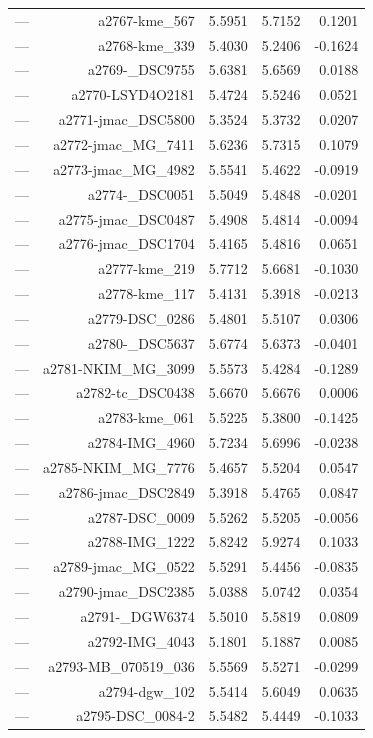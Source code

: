 \begin{table}[htbp]
\begin{tabular}{lrrrr}
— & a2767-kme_567 & 5.5951 & 5.7152 & 0.1201 \\
— & a2768-kme_339 & 5.4030 & 5.2406 & -0.1624 \\
— & a2769-_DSC9755 & 5.6381 & 5.6569 & 0.0188 \\
— & a2770-LSYD4O2181 & 5.4724 & 5.5246 & 0.0521 \\
— & a2771-jmac_DSC5800 & 5.3524 & 5.3732 & 0.0207 \\
— & a2772-jmac_MG_7411 & 5.6236 & 5.7315 & 0.1079 \\
— & a2773-jmac_MG_4982 & 5.5541 & 5.4622 & -0.0919 \\
— & a2774-_DSC0051 & 5.5049 & 5.4848 & -0.0201 \\
— & a2775-jmac_DSC0487 & 5.4908 & 5.4814 & -0.0094 \\
— & a2776-jmac_DSC1704 & 5.4165 & 5.4816 & 0.0651 \\
— & a2777-kme_219 & 5.7712 & 5.6681 & -0.1030 \\
— & a2778-kme_117 & 5.4131 & 5.3918 & -0.0213 \\
— & a2779-DSC_0286 & 5.4801 & 5.5107 & 0.0306 \\
— & a2780-_DSC5637 & 5.6774 & 5.6373 & -0.0401 \\
— & a2781-NKIM_MG_3099 & 5.5573 & 5.4284 & -0.1289 \\
— & a2782-tc_DSC0438 & 5.6670 & 5.6676 & 0.0006 \\
— & a2783-kme_061 & 5.5225 & 5.3800 & -0.1425 \\
— & a2784-IMG_4960 & 5.7234 & 5.6996 & -0.0238 \\
— & a2785-NKIM_MG_7776 & 5.4657 & 5.5204 & 0.0547 \\
— & a2786-jmac_DSC2849 & 5.3918 & 5.4765 & 0.0847 \\
— & a2787-DSC_0009 & 5.5262 & 5.5205 & -0.0056 \\
— & a2788-IMG_1222 & 5.8242 & 5.9274 & 0.1033 \\
— & a2789-jmac_MG_0522 & 5.5291 & 5.4456 & -0.0835 \\
— & a2790-jmac_DSC2385 & 5.0388 & 5.0742 & 0.0354 \\
— & a2791-_DGW6374 & 5.5010 & 5.5819 & 0.0809 \\
— & a2792-IMG_4043 & 5.1801 & 5.1887 & 0.0085 \\
— & a2793-MB_070519_036 & 5.5569 & 5.5271 & -0.0299 \\
— & a2794-dgw_102 & 5.5414 & 5.6049 & 0.0635 \\
— & a2795-DSC_0084-2 & 5.5482 & 5.4449 & -0.1033 \\

\end{tabular}
\end{table}
